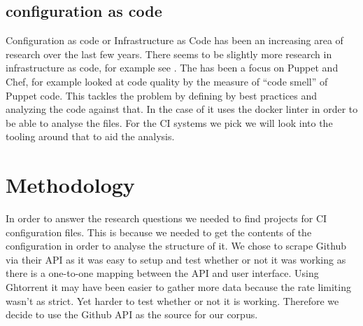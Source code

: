 \documentclass[10pt,conference]{IEEEtran}
\begin{document}
\vspace*{-0.05in}
\subsection{configuration as code}
\vspace*{-0.05in}

Configuration as code or Infrastructure as Code has been an increasing area of research over the last few years. There seems to be slightly more research in infrastructure as code, for example see \citet{Rahman2019}. The has been a focus on Puppet and Chef, for example \citet{Sharma2016} looked at code quality by the measure of \enquote{code smell} of Puppet code. This tackles the problem by defining by best practices and analyzing the code against that. In the case of \citet{Cito2017} it uses the docker linter in order to be able to analyse the files. 
For the CI systems we pick we will look into the tooling around that to aid the analysis.


\section{Methodology}
\label{methodology}
In order to answer the research questions we needed to find projects for CI configuration files. This is because we needed to get the contents of the configuration in order to analyse the structure of it. We chose to scrape Github via their API as it was easy to setup and test whether or not it was working as there is a one-to-one mapping between the API and user interface. Using Ghtorrent \citet{GhTorrent2020} it may have been easier to gather more data because the rate limiting wasn't as strict. Yet harder to test whether or not it is working. Therefore we decide to use the Github API as the source for our corpus.
\end{document}
